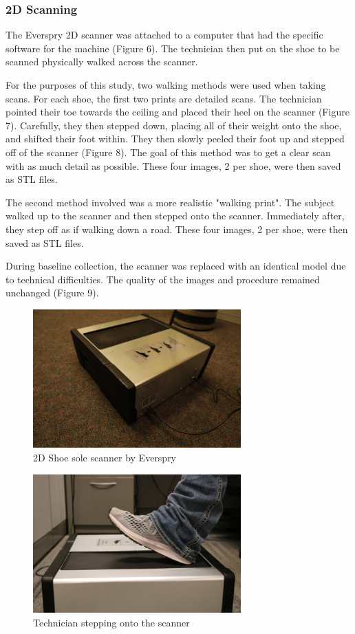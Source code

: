 \newpage

\subsubsection{2D Scanning}

 The Everspry 2D scanner was attached to a computer that had the specific software for the machine (Figure 6). The technician then put on the shoe to be scanned physically walked across the scanner. 
   
   For the purposes of this study, two walking methods were used when taking scans. For each shoe, the first two prints are detailed scans. The technician pointed their toe towards the ceiling and placed their heel on the scanner (Figure 7). Carefully, they then stepped down, placing all of their weight onto the shoe, and shifted their foot within. They then slowly peeled their foot up and stepped off of the scanner (Figure 8). The goal of this method was to get a clear scan with as much detail as possible. These four images, 2 per shoe, were then saved as STL files.
   
   The second method involved was a more realistic "walking print". The subject walked up to the scanner and then stepped onto the scanner. Immediately after, they step off as if walking down a road. These four images, 2 per shoe, were then saved as STL files.
   
   During baseline collection, the scanner was replaced with an identical model due to technical difficulties. The quality of the images and procedure remained unchanged (Figure 9). 

\begin{figure}[!htp]   
\centering
\includegraphics[width=8cm]{2D_Scanner}
\caption{2D Shoe sole scanner by Everspry}
\label{Image 6}
\end{figure}

\begin{figure}[!htp]   
\centering
\includegraphics[width=8cm]{2D_Step_on}
\caption{Technician stepping onto the scanner}
\label{Image 7}
\end{figure}


